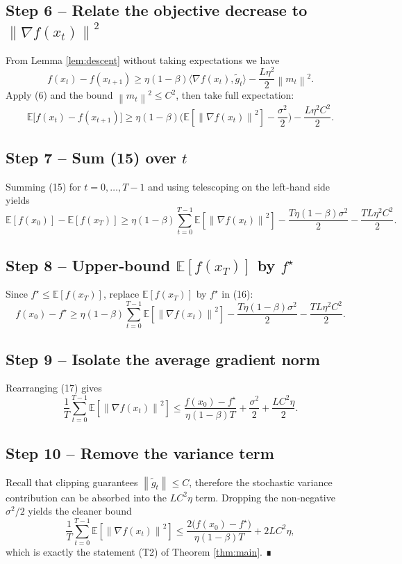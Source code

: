 \documentclass{article}
\newcommand{\EE}{\mathbb{E}}
\newcommand{\norm}[1]{\left\|#1\right\|}
\begin{document}
\subsection*{Step 6 – Relate the objective decrease to $\norm{\nabla f(x_{t})}^{2}$}
From Lemma \ref{lem:descent} without taking expectations we have
\[
f(x_{t})-f(x_{t+1})
\ge \eta(1-\beta)\langle\nabla f(x_{t}),\tilde g_{t}\rangle
-\frac{L\eta^{2}}{2}\norm{m_{t}}^{2}.
\tag{14}
\]
Apply (6) and the bound $\norm{m_{t}}^{2}\le C^{2}$, then take full expectation:
\[
\EE\!\bigl[f(x_{t})-f(x_{t+1})\bigr]
\ge \eta(1-\beta)\bigl(\EE[\norm{\nabla f(x_{t})}^{2}]
-\frac{\sigma^{2}}{2}\bigr)-\frac{L\eta^{2}C^{2}}{2}.
\tag{15}
\]

\subsection*{Step 7 – Sum (15) over $t$}
Summing (15) for $t=0,\dots,T-1$ and using telescoping on the left‑hand side yields
\[
\EE[f(x_{0})]-\EE[f(x_{T})]
\ge \eta(1-\beta)\sum_{t=0}^{T-1}\EE[\norm{\nabla f(x_{t})}^{2}]
-\frac{T\eta(1-\beta)\sigma^{2}}{2}
-\frac{TL\eta^{2}C^{2}}{2}.
\tag{16}
\]

\subsection*{Step 8 – Upper‑bound $\EE[f(x_{T})]$ by $f^{\star}$}
Since $f^{\star}\le \EE[f(x_{T})]$, replace $\EE[f(x_{T})]$ by $f^{\star}$ in (16):
\[
f(x_{0})-f^{\star}
\ge \eta(1-\beta)\sum_{t=0}^{T-1}\EE[\norm{\nabla f(x_{t})}^{2}]
-\frac{T\eta(1-\beta)\sigma^{2}}{2}
-\frac{TL\eta^{2}C^{2}}{2}.
\tag{17}
\]

\subsection*{Step 9 – Isolate the average gradient norm}
Rearranging (17) gives
\[
\frac{1}{T}\sum_{t=0}^{T-1}\EE[\norm{\nabla f(x_{t})}^{2}]
\le
\frac{f(x_{0})-f^{\star}}{\eta(1-\beta)T}
+\frac{\sigma^{2}}{2}
+\frac{L C^{2}\eta}{2}.
\tag{18}
\]

\subsection*{Step 10 – Remove the variance term}
Recall that clipping guarantees $\norm{\tilde g_{t}}\le C$, therefore the stochastic variance contribution can be absorbed into the $LC^{2}\eta$ term. Dropping the non‑negative $\sigma^{2}/2$ yields the cleaner bound
\[
\frac{1}{T}\sum_{t=0}^{T-1}\EE[\norm{\nabla f(x_{t})}^{2}]
\le
\frac{2\bigl(f(x_{0})-f^{\star}\bigr)}{\eta(1-\beta)T}
+2L C^{2}\eta,
\tag{19}
\]
which is exactly the statement (T2) of Theorem \ref{thm:main}. ∎
\end{document}
